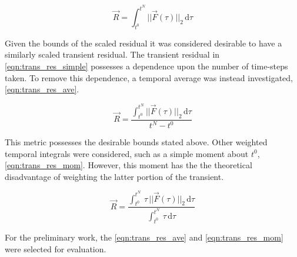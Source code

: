 \begin{equation}
\label{eqn:trans_res_simple}
\vec{R} = \int_{t^{0}}^{t^{N}} ||\vec{F}(\tau)||_2 \,\mathrm{d} \tau
\end{equation}

Given the bounds of the scaled residual it was considered desirable to have a similarly scaled transient residual.
The transient residual in \eqref{eqn:trans_res_simple} possesses a dependence upon the number of time-steps taken.
To remove this dependence, a temporal average was instead investigated, \eqref{eqn:trans_res_ave}.

\begin{equation}
\label{eqn:trans_res_ave}
\vec{R} = \frac{\int_{t^{0}}^{t^{N}} ||\vec{F}(\tau)||_2 \,\mathrm{d} \tau}{t^{N} - t^{0}}
\end{equation}

This metric possesses the desirable bounds stated above.
Other weighted temporal integrals were considered, such as a simple moment about $t^{0}$, \eqref{eqn:trans_res_mom}.
However, this moment has the the theoretical disadvantage of weighting the latter portion of the transient.

\begin{equation}
\label{eqn:trans_res_mom}
\vec{R} = \frac{\int_{t^{0}}^{t^{N}} \,\tau\,||\vec{F}(\tau)||_2 \,\mathrm{d} \tau}{\int_{t^{0}}^{t^{N}} \,\tau \,\mathrm{d} \tau}
\end{equation}

For the preliminary work, the \eqref{eqn:trans_res_ave} and \eqref{eqn:trans_res_mom} were selected for evaluation.
